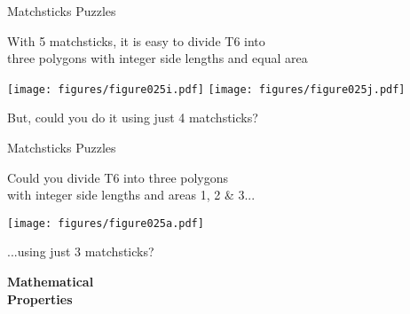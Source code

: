 \documentclass[14pt]{beamer}
\begin{document}

    \begin{frame}{Matchsticks Puzzles}
        \begin{center}
            {With 5 matchsticks, it is easy to divide T6 into\\[1ex]three polygons with integer side lengths and equal area}

            \bigskip\bigskip

            \texttt{[image: figures/figure025i.pdf]}\qquad
            \texttt{[image: figures/figure025j.pdf]}\\

            \bigskip\bigskip

            {But, could you do it using just 4 matchsticks?}

            \bigskip\bigskip
        \end{center}
    \end{frame}


    \begin{frame}{Matchsticks Puzzles}
        \begin{center}
            {Could you divide T6 into three polygons\\[1ex]with integer side lengths and areas 1, 2 \& 3...}

            \bigskip

            \texttt{[image: figures/figure025a.pdf]}

            \bigskip

            {...using just 3 matchsticks?}

            \bigskip\bigskip
        \end{center}
    \end{frame}


    \begin{frame}{}
        \begin{center}
            \textbf{\Huge Mathematical\\\bigskip Properties}\\
        \end{center}
    \end{frame}
\end{document}
